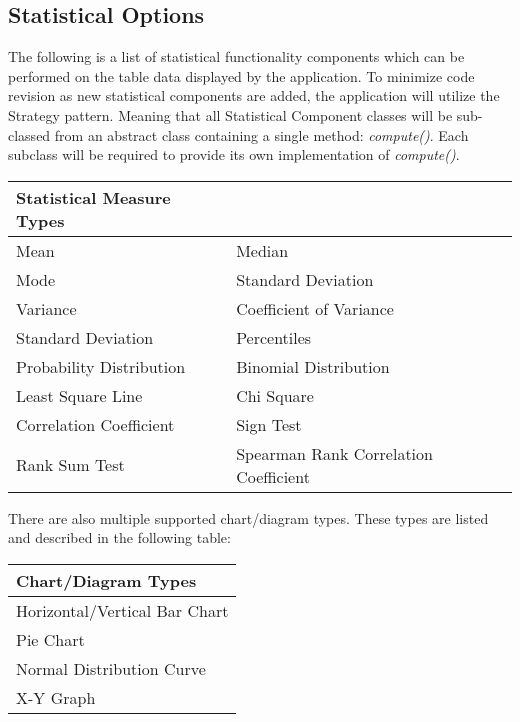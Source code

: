\documentclass[12pt]{article}
\begin{document}
\subsection{Statistical Options}
The following is a list of statistical functionality components which can be
performed on the table data displayed by the application. To minimize code
revision as new statistical components are added, the application will utilize
the Strategy pattern. Meaning that all Statistical Component classes will be
sub-classed from an abstract class containing a single method:
\textit{compute()}. Each subclass will be required to provide its own
implementation of \textit{compute()}.

\begin{center}
\begin{tabularx}{\textwidth}{|X||p{72mm}|}
\hline \textbf{Statistical Measure Types} & \\
\hline Mean & Median \\
\hline Mode & Standard Deviation \\
\hline Variance & Coefficient of Variance \\
\hline Standard Deviation & Percentiles \\
\hline Probability Distribution & Binomial Distribution \\
\hline Least Square Line & Chi Square \\
\hline Correlation Coefficient & Sign Test \\
\hline Rank Sum Test & Spearman Rank Correlation Coefficient \\
\hline
\end{tabularx}
\end{center}

There are also multiple supported chart/diagram types. These types are listed
and described in the following table:

\begin{center}
\begin{tabularx}{\textwidth}{|X|}
\hline \textbf{Chart/Diagram Types} \\
\hline Horizontal/Vertical Bar Chart \\
\hline Pie Chart \\
\hline Normal Distribution Curve \\
\hline X-Y Graph \\
\hline
\end{tabularx}
\end{center}

\end{document}
